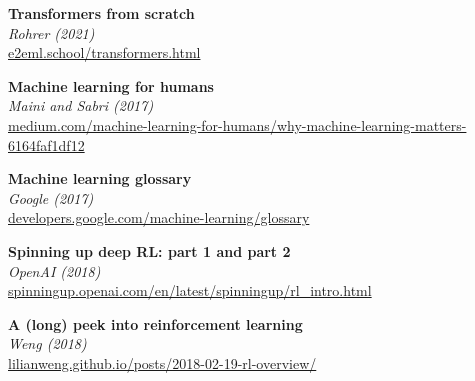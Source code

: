 \documentclass[12pt]{article}
\begin{document}
\vspace{1em}
\noindent\textbf{Transformers from scratch}\\
\textit{Rohrer (2021)}\\
{\small \url{e2eml.school/transformers.html}}

\vspace{1em}
\noindent\textbf{Machine learning for humans}\\
\textit{Maini and Sabri (2017)}\\
{\small \url{medium.com/machine-learning-for-humans/why-machine-learning-matters-6164faf1df12}}

\vspace{1em}
\noindent\textbf{Machine learning glossary}\\
\textit{Google (2017)}\\
{\small \url{developers.google.com/machine-learning/glossary}}

\vspace{1em}
\noindent\textbf{Spinning up deep RL: part 1 and part 2}\\
\textit{OpenAI (2018)}\\
{\small \url{spinningup.openai.com/en/latest/spinningup/rl_intro.html}}

\vspace{1em}
\noindent\textbf{A (long) peek into reinforcement learning}\\
\textit{Weng (2018)}\\
{\small \url{lilianweng.github.io/posts/2018-02-19-rl-overview/}}

\vspace{1em}


\vspace{4em}
\end{document}

